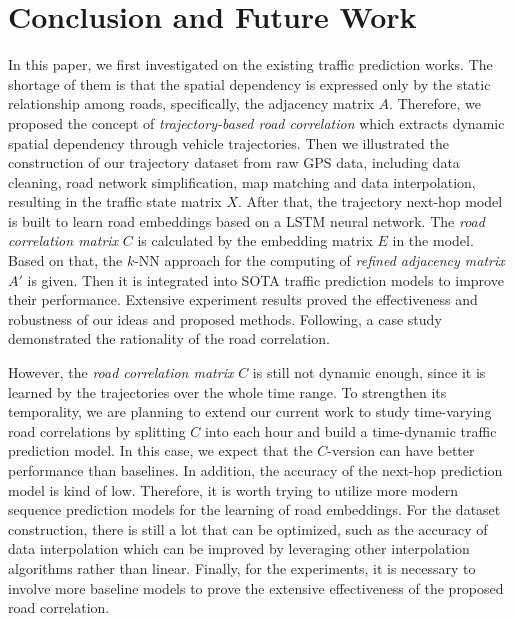 
\section{Conclusion and Future Work}
In this paper, we first investigated on the existing traffic prediction works. The shortage of them is that the spatial dependency is expressed only by the static relationship among roads, specifically, the adjacency matrix $A$. Therefore, we proposed the concept of \textit{trajectory-based road correlation} which extracts dynamic spatial dependency through vehicle trajectories. Then we illustrated the construction of our trajectory dataset from raw GPS data, including data cleaning, road network simplification, map matching and data interpolation, resulting in the traffic state matrix $X$. After that, the trajectory next-hop model is built to learn road embeddings based on a LSTM neural network. The \textit{road correlation matrix} $C$ is calculated by the embedding matrix $E$ in the model. Based on that, the $k$-NN approach for the computing of \textit{refined adjacency matrix} $A'$ is given. Then it is integrated into SOTA traffic prediction models to improve their performance. Extensive experiment results proved the effectiveness and robustness of our ideas and proposed methods. Following, a case study demonstrated the rationality of the road correlation.

However, the \textit{road correlation matrix} $C$ is still not dynamic enough, since it is learned by the trajectories over the whole time range. To strengthen its temporality, we are planning to extend our current work to study time-varying road correlations by splitting $C$ into each hour and build a time-dynamic traffic prediction model. In this case, we expect that the $C$-version can have better performance than baselines. In addition, the accuracy of the next-hop prediction model is kind of low. Therefore, it is worth trying to utilize more modern sequence prediction models for the learning of road embeddings. For the dataset construction, there is still a lot that can be optimized, such as the accuracy of data interpolation which can be improved by leveraging other interpolation algorithms rather than linear. Finally, for the experiments, it is necessary to involve more baseline models to prove the extensive effectiveness of the proposed road correlation.
